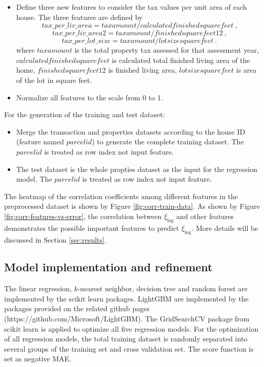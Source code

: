 \documentclass[12pt]{article}
\begin{document}
\begin{itemize}
	\item Define three new features to consider the tax values per unit area of each house. The three features are defined by 
	\begin{equation}
		tax\_per\_liv\_area=taxamount/calculatedfinishedsquarefeet~\text{,}
	\end{equation}
	\begin{equation}
	tax\_per\_liv\_area2=taxamount/finishedsquarefeet12~\text{,}
	\end{equation}	
	\begin{equation}
	tax\_per\_lot\_size=taxamount/lotsizesquarefeet~\text{.}
	\end{equation}	
    where $taxamount$ is the total property tax assessed for that assessment year, $calculatedfinishedsquarefeet$ is calculated total finished living area of the home, $finishedsquarefeet12$ is finished living area, $lotsizesquarefeet$ is area of the lot in square feet.
\end{itemize}

\begin{itemize}
	\item Normalize all features to the scale from 0 to 1.
\end{itemize}

For the generation of the training and test dataset:
\begin{itemize}
	\item Merge the transaction and properties datasets according to the house ID (feature named $parcelid$) to generate the complete training dataset. The $parcelid$ is treated as row index not input feature.
\end{itemize}

\begin{itemize}
	\item The test dataset is the whole propties dataset as the input for the regression model. The $parcelid$ is treated as row index not input feature.
\end{itemize}

The heatmap of the correlation coefficients among different features in the preprocessed dataset is shown by Figure \ref{fig:corr-train-data}. As shown by Figure \ref{fig:corr-features-vs-error}, the correlation between $\xi_{\log}$ and other features demonstrates the possible important features to predict $\xi_{\log}$. More details will be discussed in Section \ref{sec:results}.

\subsection{Model implementation and refinement}
The linear regression, $k$-nearest neighbor, decision tree and random forest are implemented by the scikit learn packages. LightGBM are implemented by the packages provided on the related github pages (https://github.com/Microsoft/LightGBM). The GridSearchCV package from scikit learn is applied to optimize all five regression models. For the optimization of all regression models, the total training dataset is randomly separated into several groups of the training set and cross validation set. The score function is set as negative MAE.
\end{document}
